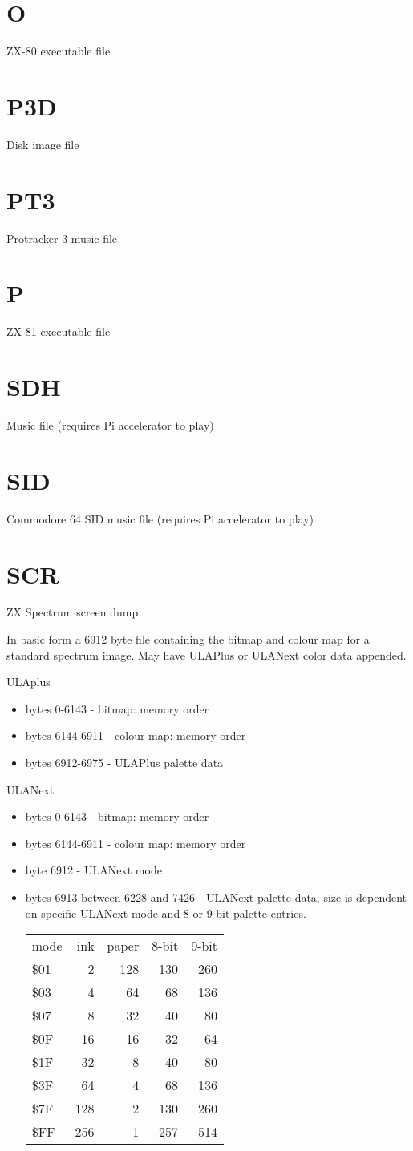 \section{O}
ZX-80 executable file
\section{P3D}
Disk image file
\section{PT3}
Protracker 3 music file
\section{P}
ZX-81 executable file
\section{SDH}
Music file (requires Pi accelerator to play)
\section{SID}
Commodore 64 SID music file (requires Pi accelerator to play)
\section{SCR}
ZX Spectrum screen dump

In basic form a 6912 byte file containing the bitmap and colour map
for a standard spectrum image. May have ULAPlus or ULANext color data
appended.

ULAplus
\begin{itemize}
\item bytes 0-6143 - bitmap: memory order
\item bytes 6144-6911 - colour map: memory order
\item bytes 6912-6975 - ULAPlus palette data
\end{itemize}
ULANext
\begin{itemize}
\item bytes 0-6143 - bitmap: memory order
\item bytes 6144-6911 - colour map: memory order
\item byte 6912 - ULANext mode
\item bytes 6913-between 6228 and 7426 - ULANext palette data, size is
  dependent on specific ULANext mode and 8 or 9 bit palette entries.
  \begin{tabular}{l | r | r | r | r}
    mode & ink & paper & 8-bit & 9-bit \\
    \$01 & 2 & 128 & 130 & 260\\
    \$03 & 4 & 64 & 68 & 136\\
    \$07 & 8 & 32 & 40 & 80\\
    \$0F & 16 & 16 & 32 & 64\\
    \$1F & 32 & 8 & 40 & 80\\
    \$3F & 64 & 4 & 68 & 136\\
    \$7F & 128 & 2 & 130 & 260\\
    \$FF & 256 & 1 & 257 & 514
  \end{tabular}
\end{itemize}
